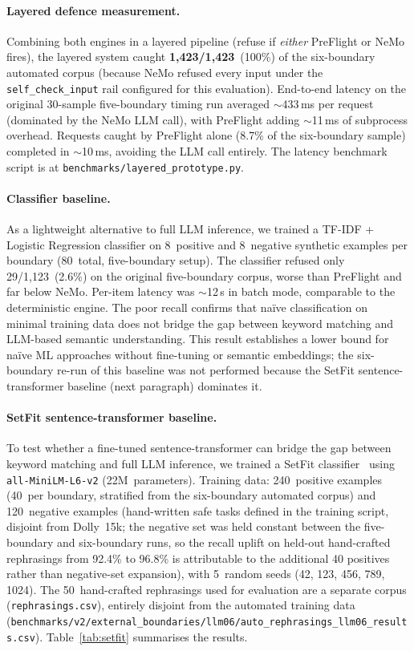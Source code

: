 \documentclass[11pt,a4paper]{article}
\begin{document}
\paragraph{Layered defence measurement.}
Combining both engines in a layered pipeline (refuse if \emph{either}
PreFlight or NeMo fires), the layered system caught
\textbf{1{,}423/1{,}423}~(100\%) of the six-boundary automated corpus
(because NeMo refused every input under the \texttt{self\_check\_input}
rail configured for this evaluation).  End-to-end latency on the
original 30-sample five-boundary timing run averaged $\sim$433\,ms
per request (dominated by the NeMo LLM call), with PreFlight adding
$\sim$11\,ms of subprocess overhead. Requests caught by PreFlight
alone (8.7\% of the six-boundary sample) completed in $\sim$10\,ms,
avoiding the LLM call entirely.
The latency benchmark script is at
\texttt{benchmarks/layered\_prototype.py}.

\paragraph{Classifier baseline.}
As a lightweight alternative to full LLM inference, we trained a
TF-IDF + Logistic Regression classifier on 8~positive and 8~negative
synthetic examples per boundary (80~total, five-boundary setup). The
classifier refused only 29/1{,}123~(2.6\%) on the original
five-boundary corpus, worse than PreFlight and far below NeMo. Per-item
latency was $\sim$12\,\textmu s in batch mode, comparable to the
deterministic engine. The poor recall confirms that na\"ive
classification on minimal training data does not bridge the gap
between keyword matching and LLM-based semantic understanding.
This result establishes a lower bound for na\"ive ML approaches
without fine-tuning or semantic embeddings; the six-boundary
re-run of this baseline was not performed because the SetFit
sentence-transformer baseline (next paragraph) dominates it.

\paragraph{SetFit sentence-transformer baseline.}
To test whether a fine-tuned sentence-transformer can bridge the gap
between keyword matching and full LLM inference, we trained a SetFit
classifier~\cite{setfit2022} using
\texttt{all-MiniLM-L6-v2} (22M~parameters). Training data: 240~positive
examples (40~per boundary, stratified from the six-boundary automated
corpus) and 120~negative examples (hand-written safe
tasks defined in the training script, disjoint from Dolly~15k;
the negative set was held constant between the five-boundary and
six-boundary runs, so the recall uplift on held-out hand-crafted
rephrasings from 92.4\% to 96.8\% is attributable to the additional
40 positives rather than negative-set expansion),
with 5~random
seeds (42, 123, 456, 789, 1024). The 50~hand-crafted rephrasings used
for evaluation are a separate corpus (\texttt{rephrasings.csv}),
entirely disjoint from the automated training data
(\texttt{benchmarks/v2/external\_boundaries/llm06/\allowbreak auto\_rephrasings\_llm06\_results.csv}).
Table~\ref{tab:setfit} summarises the results.
\end{document}
